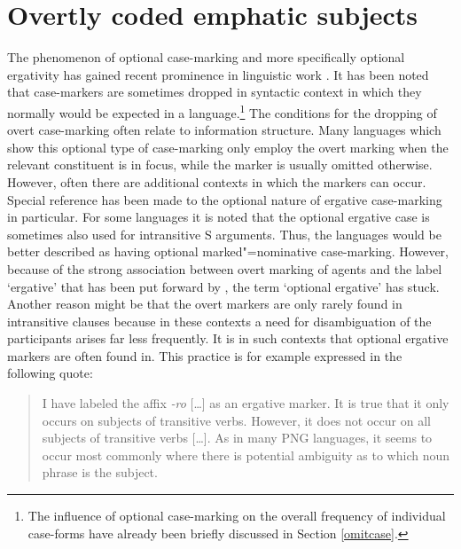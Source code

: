 

\section{Overtly coded emphatic subjects}\label{focusNOM}

The phenomenon of optional case-marking and more specifically optional ergativity has gained recent prominence in linguistic work \citep[see][]{OptionalErg}. 
It has been noted that case-markers are sometimes dropped in syntactic context in which they normally would be expected in a language.\footnote{The influence of optional case-marking on the overall frequency of individual case-forms have already been briefly discussed in Section \ref{omitcase}.} 
The conditions for the dropping of overt case-marking often relate to information structure. 
Many languages which show this optional type of case-marking only employ the overt marking when the relevant constituent is in focus, while the marker is usually omitted otherwise. 
However, often there are additional contexts in which the markers can occur.
Special reference has been made to the optional nature of ergative case-marking in particular. 
For some languages it is noted that the optional ergative case is sometimes also used for intransitive S arguments. 
Thus, the languages would be better described as having optional marked"=nominative case-marking. 
However, because of the strong association between overt marking of agents and the label `ergative' that has been put forward by \citet{Dixon:1979}, the term `optional ergative' has stuck. 
Another reason might be that the overt markers are only rarely found in intransitive clauses because in these contexts a need for disambiguation of the participants arises far less frequently.
It is in such contexts that optional ergative markers are often found in. 
This practice is for example expressed in the following quote:  

\begin{quote}
I have labeled the affix \emph{-ro} [\dots] as an ergative marker. It is true that it only occurs on subjects of transitive verbs. However, it does not occur on all subjects of transitive verbs [\dots]. As in many PNG languages, it seems to occur most commonly where there is potential ambiguity as to which noun phrase is the subject. \citep[22]{Clifton:1997}
\end{quote}

